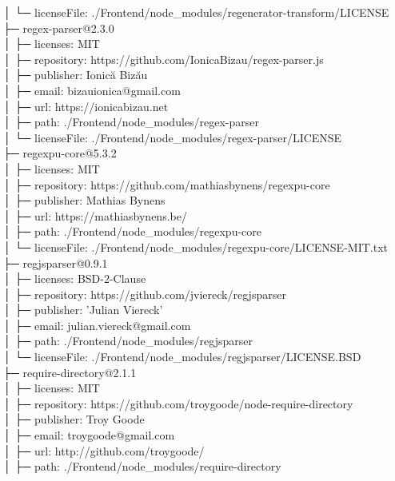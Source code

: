 \documentclass[
    paper=a4,
    twoside=false,
    parskip=half,
    listof=entryprefix,
    listof=totoc,
    index=totoc,
    bibliography=totoc,
    headsepline,
]{scrbook}
\begin{document}
    │  └─ licenseFile: ./Frontend/node\_modules/regenerator-transform/LICENSE\\
    ├─ regex-parser@2.3.0\\
    │  ├─ licenses: MIT\\
    │  ├─ repository: https://github.com/IonicaBizau/regex-parser.js\\
    │  ├─ publisher: Ionică Bizău\\
    │  ├─ email: bizauionica@gmail.com\\
    │  ├─ url: https://ionicabizau.net\\
    │  ├─ path: ./Frontend/node\_modules/regex-parser\\
    │  └─ licenseFile: ./Frontend/node\_modules/regex-parser/LICENSE\\
    ├─ regexpu-core@5.3.2\\
    │  ├─ licenses: MIT\\
    │  ├─ repository: https://github.com/mathiasbynens/regexpu-core\\
    │  ├─ publisher: Mathias Bynens\\
    │  ├─ url: https://mathiasbynens.be/\\
    │  ├─ path: ./Frontend/node\_modules/regexpu-core\\
    │  └─ licenseFile: ./Frontend/node\_modules/regexpu-core/LICENSE-MIT.txt\\
    ├─ regjsparser@0.9.1\\
    │  ├─ licenses: BSD-2-Clause\\
    │  ├─ repository: https://github.com/jviereck/regjsparser\\
    │  ├─ publisher: 'Julian Viereck'\\
    │  ├─ email: julian.viereck@gmail.com\\
    │  ├─ path: ./Frontend/node\_modules/regjsparser\\
    │  └─ licenseFile: ./Frontend/node\_modules/regjsparser/LICENSE.BSD\\
    ├─ require-directory@2.1.1\\
    │  ├─ licenses: MIT\\
    │  ├─ repository: https://github.com/troygoode/node-require-directory\\
    │  ├─ publisher: Troy Goode\\
    │  ├─ email: troygoode@gmail.com\\
    │  ├─ url: http://github.com/troygoode/\\
    │  ├─ path: ./Frontend/node\_modules/require-directory\\
\end{document}
